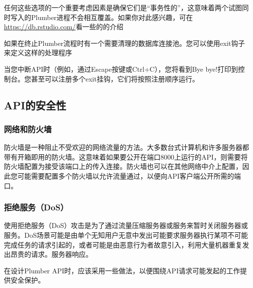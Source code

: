 \documentclass[]{book}
\newenvironment{Shaded}{\begin{snugshade}}{\end{snugshade}}
\newcommand{\KeywordTok}[1]{\textcolor[rgb]{0.13,0.29,0.53}{\textbf{#1}}}
\newcommand{\StringTok}[1]{\textcolor[rgb]{0.31,0.60,0.02}{#1}}
\newcommand{\ControlFlowTok}[1]{\textcolor[rgb]{0.13,0.29,0.53}{\textbf{#1}}}
\newcommand{\OperatorTok}[1]{\textcolor[rgb]{0.81,0.36,0.00}{\textbf{#1}}}
\newcommand{\NormalTok}[1]{#1}
\begin{document}
任何这些选项的一个重要考虑因素是确保它们是``事务性的''，这意味着两个试图同时写入的Plumber进程不会相互覆盖。如果你对此感兴趣，可在\url{https://db.rstudio.com/}看一些的的介绍

如果在终止Plumber流程时有一个需要清理的数据库连接池。您可以使用exit钩子来定义这样的处理程序

\begin{Shaded}
\end{Shaded}

当您中断API时（例如，通过Escape按键或Ctrl+C），您将看到Bye
bye!打印到控制台。您甚至可以注册多个exit挂钩，它们将按照注册顺序运行。

\subsection{API的安全性}\label{api}

\subsubsection{网络和防火墙}

防火墙是一种阻止不受欢迎的网络流量的方法。大多数台式计算机和许多服务器都带有开箱即用的防火墙。这意味着如果要公开在端口8000上运行的API，则需要将防火墙配置为接受该端口上的传入连接。防火墙也可以在其他网络中介上配置，因此您可能需要配置多个防火墙以允许流量通过，以便向API客户端公开所需的端口。

\subsubsection{拒绝服务（DoS）}\label{dos}

使用拒绝服务（DoS）攻击是为了通过流量压缩服务器或服务来暂时关闭服务器或服务。DoS场景可能是由单个无知用户无意中发出可能要求服务器执行某项不可能完成任务的请求引起的，或者可能是由恶意行为者故意引入，利用大量机器重复发出昂贵的请求。服务器响应。

在设计Plumber
API时，应该采用一些做法，以便围绕API请求可能发起的工作提供安全保护。
\end{document}
